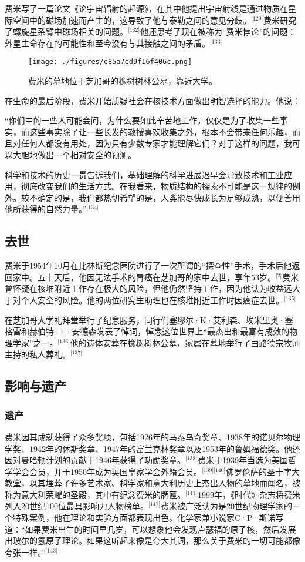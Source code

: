费米写了一篇论文《论宇宙辐射的起源》，在其中他提出宇宙射线是通过物质在星际空间中的磁场加速而产生的，这导致了他与泰勒之间的意见分歧。\(^\text{[129]}\)费米研究了螺旋星系臂中磁场相关的问题。\(^\text{[132]}\)他还思考了现在被称为“费米悖论”的问题：外星生命存在的可能性和至今没有与其接触之间的矛盾。\(^\text{[133]}\)
\begin{figure}[ht]
\centering
\texttt{[image: ./figures/c85a7ed9f16f406c.png]}
\caption{费米的墓地位于芝加哥的橡树树林公墓，靠近大学。} \label{fig_ELK_13}
\end{figure}
在生命的最后阶段，费米开始质疑社会在核技术方面做出明智选择的能力。他说：

“你们中的一些人可能会问，为什么要如此辛苦地工作，仅仅是为了收集一些事实，而这些事实除了让一些长发的教授喜欢收集之外，根本不会带来任何乐趣，而且对任何人都没有用处，因为只有少数专家才能理解它们？对于这样的问题，我可以大胆地做出一个相对安全的预测。

科学和技术的历史一贯告诉我们，基础理解的科学进展迟早会导致技术和工业应用，彻底改变我们的生活方式。在我看来，物质结构的探索不可能是这一规律的例外。较不确定的是，我们都热切希望的是，人类能尽快成长为足够成熟，以便善用他所获得的自然力量。”\(^\text{[134]}\)
\subsection{去世}
费米于1954年10月在比林斯纪念医院进行了一次所谓的“探查性”手术，手术后他返回家中。五十天后，他因无法手术的胃癌在芝加哥的家中去世，享年53岁。\(^\text{[2]}\)费米曾怀疑在核堆附近工作存在极大的风险，但他仍然坚持工作，因为他认为收益远大于对个人安全的风险。他的两位研究生助理也在核堆附近工作时因癌症去世。\(^\text{[135]}\)

在芝加哥大学礼拜堂举行了纪念服务，同行们塞缪尔·K·艾利森、埃米里奥·塞格雷和赫伯特·L·安德森发表了悼词，悼念这位世界上“最杰出和最富有成效的物理学家”之一。\(^\text{[136]}\)他的遗体安葬在橡树树林公墓，家属在墓地举行了由路德宗牧师主持的私人葬礼。\(^\text{[137]}\)
\subsection{影响与遗产}
\subsubsection{遗产}
费米因其成就获得了众多奖项，包括1926年的马泰乌奇奖章、1938年的诺贝尔物理学奖、1942年的休斯奖章、1947年的富兰克林奖章以及1953年的鲁姆福德奖。他还因对曼哈顿计划的贡献于1946年获得了功勋奖章。\(^\text{[138]}\)费米于1939年当选为美国哲学学会会员，并于1950年成为英国皇家学会外籍会员。\(^\text{[139][140]}\)佛罗伦萨的圣十字大教堂，以其埋葬了许多艺术家、科学家和意大利历史上杰出人物的墓地而闻名，被称为意大利荣耀的圣殿，其中有纪念费米的牌匾。\(^\text{[141]}\)1999年，《时代》杂志将费米列入20世纪100位最具影响力人物榜单。\(^\text{[142]}\)费米被广泛认为是20世纪物理学家的一个特殊案例，他在理论和实验方面都表现出色。化学家兼小说家C·P·斯诺写道：“如果费米出生的时间早几岁，可以想象他会发现卢瑟福的原子核，然后发展出玻尔的氢原子理论。如果这听起来像是夸大其词，那么关于费米的一切可能都像夸张一样。”\(^\text{[143]}\)

